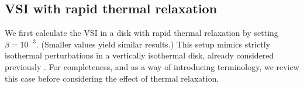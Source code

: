 \subsection{VSI with rapid thermal relaxation}\label{vertiso_pertiso} 
We first calculate the VSI in a disk with rapid thermal relaxation by
setting $\beta=10^{-3}$. (Smaller values yield similar results.) 
This setup mimics strictly isothermal perturbations in a vertically
isothermal disk, already considered previously . 
For completeness, and as a way of introducing terminology, 
we review this case before considering the effect of 
thermal relaxation. %




